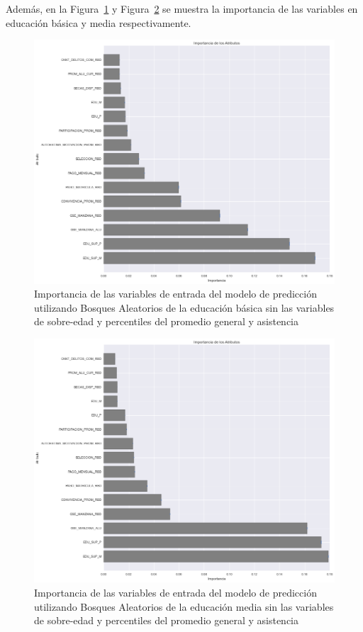 Además, en la Figura~\ref{fig:impo-basica} y Figura~\ref{fig:impo-media} se muestra la importancia de las variables en educación básica y media respectivamente.

\begin{figure}[H]
  \centering
    \includegraphics[trim=0cm 0cm 0cm 0cm,scale=0.4]{Figuras/7AnalisisResultado/impo-basica.png}
      \caption{Importancia de las variables de entrada del modelo de predicción utilizando Bosques Aleatorios de la educación básica sin las variables de sobre-edad y percentiles del promedio general y asistencia}
    \label{fig:impo-basica}
\end{figure}

\begin{figure}[H]
  \centering
    \includegraphics[trim=0cm 0cm 0cm 0cm,scale=0.4]{Figuras/7AnalisisResultado/impo-media.png}
      \caption{Importancia de las variables de entrada del modelo de predicción utilizando Bosques Aleatorios de la educación media sin las variables de sobre-edad y percentiles del promedio general y asistencia}
    \label{fig:impo-media}
\end{figure}